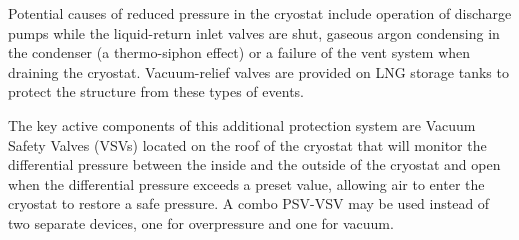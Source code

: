Potential causes of reduced pressure in the cryostat include operation of discharge pumps while the liquid-return inlet valves are shut, gaseous argon condensing in the condenser (a thermo-siphon effect) or a failure of the vent system when draining the cryostat. Vacuum-relief valves are provided on LNG storage tanks to protect the structure from these types of events.

The key active components of this additional protection system are Vacuum Safety Valves (VSVs) located on the roof of the cryostat that will monitor the differential pressure between the inside and the outside of the cryostat and open when the differential pressure exceeds a preset value, allowing air to enter the cryostat to restore a safe pressure. A combo PSV-VSV may be used instead of two separate devices, one for overpressure and one for vacuum.

